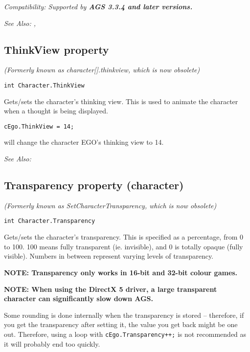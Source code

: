 \it{Compatibility:} Supported by \bf{AGS 3.3.4} and later versions.

\it{See Also:} ,


\subsection{ThinkView property}\label{Character.ThinkView}%

\it{(Formerly known as character[].thinkview, which is now obsolete)}

\begin{verbatim}
int Character.ThinkView
\end{verbatim}
Gets/sets the character's thinking view. This is used to animate the character
when a thought is being displayed.

\begin{verbatim}
cEgo.ThinkView = 14;
\end{verbatim}
will change the character EGO's thinking view to 14.

\it{See Also:} 


\subsection{Transparency property (character)}\label{Character.Transparency}%

\it{(Formerly known as SetCharacterTransparency, which is now obsolete)}

\begin{verbatim}
int Character.Transparency
\end{verbatim}
Gets/sets the character's transparency. This is specified as a percentage, from 0 to 100.
100 means fully transparent (ie. invisible), and 0 is totally opaque (fully visible). Numbers
in between represent varying levels of transparency.

\bf{NOTE:} Transparency only works in 16-bit and 32-bit colour games.

\bf{NOTE:} When using the DirectX 5 driver, a large transparent character can significantly slow
down AGS.

Some rounding is done internally when the transparency is stored -- therefore, if you get
the transparency after setting it, the value you get back might be one out. Therefore, using
a loop with \verb$cEgo.Transparency++;$ is not recommended as it will probably
end too quickly.

